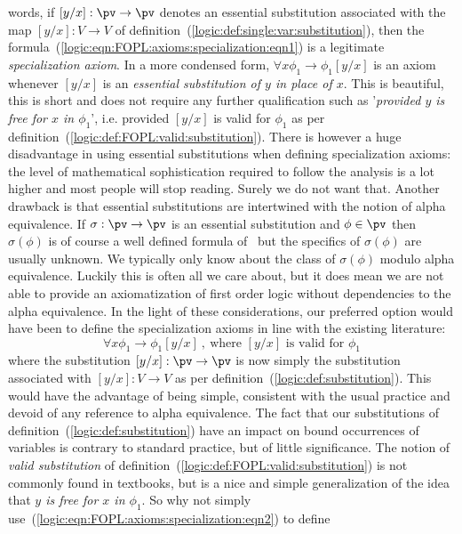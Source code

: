 words, if $[y/x]:\pv\to\pv$ denotes an essential substitution
associated with the map $[y/x]:V\to V$ of
definition~(\ref{logic:def:single:var:substitution}), then the
formula~(\ref{logic:eqn:FOPL:axioms:specialization:eqn1}) is a
legitimate {\em specialization axiom}. In a more condensed form,
$\forall x\phi_{1}\to\phi_{1}[y/x]$ is an axiom whenever $[y/x]$ is
an {\em essential substitution of $y$ in place of $x$}. This is
beautiful, this is short and does not require any further
qualification such as '{\em provided $y$ is free for $x$ in
$\phi_{1}$}', i.e. provided $[y/x]$ is valid for $\phi_{1}$ as per
definition~(\ref{logic:def:FOPL:valid:substitution}). There is
however a huge disadvantage in using essential substitutions when
defining specialization axioms: the level of mathematical
sophistication required to follow the analysis is a lot higher and
most people will stop reading. Surely we do not want that. Another
drawback is that essential substitutions are intertwined with the
notion of alpha equivalence. If $\sigma:\pv\to \pv$ is an
essential substitution and $\phi\in\pv$ then $\sigma(\phi)$ is of
course a well defined formula of \pv\ but the specifics of
$\sigma(\phi)$ are usually unknown. We typically only know about the
class of $\sigma(\phi)$ modulo alpha equivalence. Luckily
this is often all we care about, but it does mean we are not able to
provide an axiomatization of first order logic without dependencies
to the alpha equivalence. In the light of these
considerations, our preferred option would have been to define the
specialization axioms in line with the existing literature:
    \begin{equation}\label{logic:eqn:FOPL:axioms:specialization:eqn2}
    \forall x\phi_{1}\to\phi_{1}[y/x]\ ,\ \mbox{where $[y/x]$ is valid for $\phi_{1}$}
    \end{equation}
where the substitution $[y/x]:\pv\to\pv$ is now simply the
substitution associated with $[y/x]:V\to V$ as per
definition~(\ref{logic:def:substitution}). This would have the
advantage of being simple, consistent with the usual practice and
devoid of any reference to alpha equivalence. The fact
that our substitutions of definition~(\ref{logic:def:substitution})
have an impact on bound occurrences of variables is contrary to
standard practice, but of little significance. The notion of {\em
valid substitution} of
definition~(\ref{logic:def:FOPL:valid:substitution}) is not commonly
found in textbooks, but is a nice and simple generalization of the
idea that {\em $y$ is free for $x$ in $\phi_{1}$}. So why not simply
use~(\ref{logic:eqn:FOPL:axioms:specialization:eqn2}) to define
